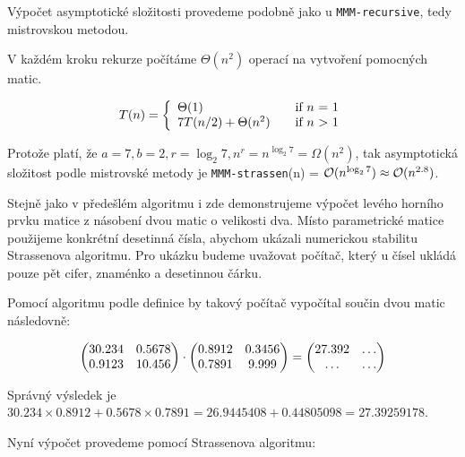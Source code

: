 Výpočet asymptotické složitosti provedeme podobně jako u \texttt{MMM-recursive}, tedy mistrovskou metodou. 

V každém kroku rekurze počítáme $\Theta(n^2)$ operací na vytvoření pomocných matic.

\[ T(n) = \left\{ 
  \begin{array}{l l}
    \Theta(1) & \quad \text{if $n$ = 1}\\
    7T(n/2) + \Theta(n^2) & \quad \text{if $n$ > 1}
  \end{array} \right.\]

Protože platí, že $a=7, b=2, r=\log_{2} 7, n^r=n^{\log_{2} 7}=\Omega(n^2)$, tak asymptotická složitost podle mistrovské metody je \texttt{MMM-strassen}(n) = $\mathcal{O}(n^{\log_{2} 7}) \approx \mathcal{O}(n^{2.8})$.

Stejně jako v předešlém algoritmu i zde demonstrujeme výpočet levého horního prvku matice z násobení dvou matic o velikosti dva. Místo parametrické matice použijeme konkrétní desetinná čísla, abychom ukázali numerickou stabilitu Strassenova algoritmu. Pro ukázku budeme uvažovat počítač, který u čísel ukládá pouze pět cifer, znaménko a desetinnou čárku.	

Pomocí algoritmu podle definice by takový počítač vypočítal součin dvou matic následovně:

\begin{align}
\begin{pmatrix}
 30.234 & 0.5678 \\
 0.9123 & 10.456
\end{pmatrix} \cdot \begin{pmatrix}
 0.8912 & 0.3456 \\
 0.7891 & 9.999 \\
\end{pmatrix} = \begin{pmatrix}
 27.392 & \hdots \\
 \hdots & \hdots
\end{pmatrix} \notag
\end{align}

Správný výsledek je $30.234 \times 0.8912 + 0.5678 \times 0.7891 = 26.9445408 + 0.44805098 = 27.39259178$.

Nyní výpočet provedeme pomocí Strassenova algoritmu:

